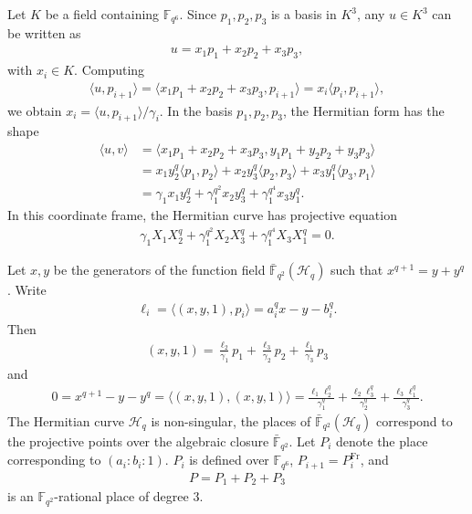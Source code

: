 \documentclass[a4paper]{amsart}
\theoremstyle{plain}
\theoremstyle{definition}
\theoremstyle{remark}
\newcommand{\Frob}{\mathrm{Fr}}
\begin{document}
Let $K$ be a field containing $\mathbb{F}_{q^6}$. Since $p_1,p_2,p_3$ is a basis in $K^3$, any $u\in K^3$ can be written as
\begin{align*} %
u=x_1p_1+x_2p_2+x_3p_3,
\end{align*}
with $x_i\in K$. Computing
\begin{align*}
\langle u, p_{i+1} \rangle = \langle x_1p_1+x_2p_2+x_3p_3, p_{i+1} \rangle = x_i \langle p_{i}, p_{i+1} \rangle,
\end{align*}
we obtain $x_i=\langle u,p_{i+1} \rangle / \gamma_i$. In the basis $p_1,p_2,p_3$, the Hermitian form has the shape
\begin{align*}
\langle u,v \rangle &= \langle x_1p_1+x_2p_2+x_3p_3,y_1p_1+y_2p_2+y_3p_3 \rangle \\
&= x_1y_2^q \langle p_1,p_2 \rangle + x_2y_3^q \langle p_2,p_3 \rangle + x_3y_1^q \langle p_3,p_1 \rangle\\
&=\gamma_1 x_1y_2^q+\gamma_1^{q^2} x_2y_3^q+\gamma_1^{q^4} x_3y_1^q.
\end{align*}
In this coordinate frame, the Hermitian curve has projective equation
\begin{align*} %
\gamma_1 X_1X_2^q+\gamma_1^{q^2} X_2X_3^q+\gamma_1^{q^4} X_3X_1^q=0.
\end{align*}

Let $x,y$ be the generators of the function field $\bar{\mathbb{F}}_{q^2}(\mathscr{H}_q)$ such that $x^{q+1}=y+y^q$. Write
\begin{align*} %
\ell_i=\langle (x,y,1), p_i \rangle = a_i^qx-y-b_i^q.
\end{align*}
Then
\begin{align*} %
(x,y,1)=\frac{\ell_{2}}{\gamma_1} p_1+\frac{\ell_{3}}{\gamma_2} p_2+\frac{\ell_{1}}{\gamma_3} p_3
\end{align*}
and
\begin{align} \label{eq:ell-q-lin-dep}
0=x^{q+1}-y-y^q = \langle (x,y,1), (x,y,1) \rangle = \frac{\ell_1\ell_{2}^q}{\gamma_1^q} + \frac{\ell_2\ell_{3}^q}{\gamma_2^q} + \frac{\ell_3\ell_{1}^q}{\gamma_3^q}.
\end{align}
The Hermitian curve $\mathscr{H}_q$ is non-singular, the places of $\bar{\mathbb{F}}_{q^2}(\mathscr{H}_q)$ correspond to the projective points over the algebraic closure $\bar{\mathbb{F}}_{q^2}$. Let $P_i$ denote the place corresponding to $(a_i:b_i:1)$. $P_i$ is defined over $\mathbb{F}_{q^6}$, $P_{i+1}=P_i^\Frob$, and 
\begin{align*} %
P=P_1+P_2+P_3
\end{align*}
is an $\mathbb{F}_{q^2}$-rational place of degree $3$. 
\end{document}
